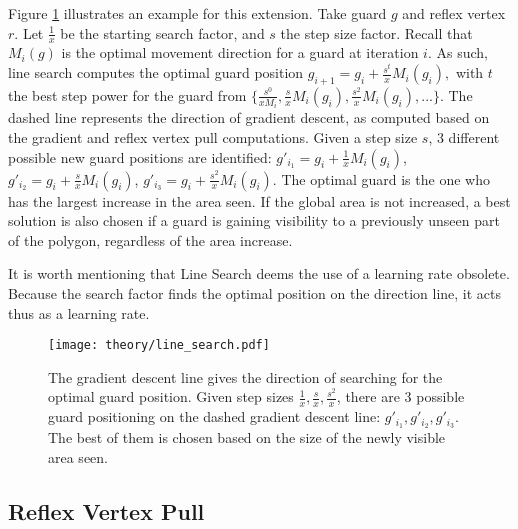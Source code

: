 Figure \ref{fig:line} illustrates an example for this extension. Take guard $g$ and reflex vertex $r$. Let $\frac 1 x$ be the starting search factor, and $s$ the step size factor. Recall that $M_i(g)$ is the optimal movement direction for a guard at iteration $i$. As such, line search  computes the optimal guard position $g_{i + 1} = g_i + \frac{s^t}{x}M_i(g_i),$ with $t$ the best step power for the guard from $\{\frac{s^0}{xM_i}, \frac{s}{x}M_i(g_i), \frac{s^2}{x}M_i(g_i), ...\}$. The dashed line represents the direction of gradient descent, as computed based on the gradient and reflex vertex pull computations. Given a step size $s$, 3 different possible new guard positions are identified: $g'_{i_1} = g_i + \frac 1 xM_i(g_i)$,  $g'_{i_2} = g_i + \frac s x M_i(g_i)$, $g'_{i_3} = g_i + \frac{s^2}{x} M_i(g_i)$.
The optimal guard is the one who has the largest increase in the area seen. If the global area is not increased, a best solution is also chosen if a guard is gaining visibility to a previously unseen part of the polygon, regardless of the area increase.

It is worth mentioning that Line Search deems the use of a learning rate obsolete. Because the search factor finds the optimal position on the direction line, it acts thus as a learning rate.

\begin{figure}[h!]
    \centering
    \texttt{[image: theory/line\_search.pdf]}
    \caption{The gradient descent line gives the direction of searching for the optimal guard position. Given step sizes $\frac 1 x, \frac s x, \frac{s^2}{x}$, there are 3 possible guard positioning on the dashed gradient descent line: $g'_{i_1}, g'_{i_2}, g'_{i_3}$. The best of them is chosen based on the size of the newly visible area seen.}
    \label{fig:line}
\end{figure}

\subsection{Reflex Vertex Pull}

